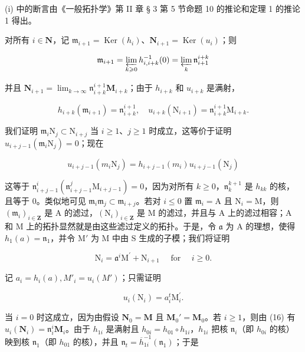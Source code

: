 	(i) 中的断言由《一般拓扑学》第 II 章 § 3 第 5 节命题 10 的推论和定理 1 的推论 1 得出。

	对所有 \(i \in \mathbf{N}\)，记 \(\mathfrak{m}_{i+1} = \operatorname{Ker}(h_i)\)、\(\mathbf{N}_{i+1} = \operatorname{Ker}(u_i)\)；则

\[
\mathfrak {m} _ {i + 1} = \varprojlim_ {k \geqslant 0} h _ {i, i + k} ^ {- 1} (0) = \varprojlim_ {k} \mathfrak {n} _ {i + 1} ^ {i + k}
\]

	并且 \(\mathbf{N}_{i + 1} = \lim_{k\to \infty}\mathfrak{n}_{i + k}^{i + 1}\mathbf{M}_{i + k}\)；由于 \(h_{i + k}\) 和 \(u_{i + k}\) 是满射，

\[
h _ {i + k} \left(\mathfrak {m} _ {i + 1}\right) = \mathfrak {n} _ {i + k} ^ {i + 1}, \quad u _ {i + k} \left(\mathrm{N} _ {i + 1}\right) = \mathfrak {n} _ {i + k} ^ {i + 1} \mathrm{M} _ {i + k}.\tag{16}
\]

	我们证明 \(\mathfrak{m}_i\mathrm{N}_j\subset \mathrm{N}_{i + j}\) 当 \(i\geqslant 1\)、\(j\geqslant 1\) 时成立，这等价于证明 \(u_{i + j - 1}(\mathfrak{m}_i\mathrm{N}_j) = 0\)；现在

\[
u _ {i + j - 1} (m _ {i} \mathrm{N} _ {j}) = h _ {i + j - 1} (m _ {i}) u _ {i + j - 1} (\mathrm{N} _ {j})
\]

	这等于 \(\mathfrak{n}_{i+j-1}^{i}(\mathfrak{n}_{i+j-1}^{j}\mathrm{M}_{i+j-1}) = 0\)，因为对所有 \(k \geqslant 0\)，\(\mathfrak{n}_k^{k+1}\) 是 \(h_{kk}\) 的核，且等于 0。类似地可见 \(\mathfrak{m}_i\mathfrak{m}_j \subset \mathfrak{m}_{i+j}\)。若对 \(i \leqslant 0\) 置 \(\mathfrak{m}_i = \mathrm{A}\) 且 \(\mathrm{N}_i = \mathrm{M}\)，则 \((\mathfrak{m}_i)_{i \in \mathbf{Z}}\) 是 \(\mathrm{A}\) 的滤过，\((\mathrm{N}_i)_{i \in \mathbf{Z}}\) 是 \(\mathrm{M}\) 的滤过，并且与 \(\mathrm{A}\) 上的滤过相容；\(\mathrm{A}\) 和 \(\mathrm{M}\) 上的拓扑显然就是由这些滤过定义的拓扑。于是，令 \(\mathfrak{a}\) 为 \(\mathrm{A}\) 的理想，使得 \(h_1(a) = \mathfrak{n}_1\)，并令 \(\mathrm{M}'\) 为 \(\mathrm{M}\) 中由 \(\mathrm{S}\) 生成的子模；我们将证明

\[
\mathrm{N} _ {i} = \mathfrak {a} ^ {i} \mathrm{M} ^ {\prime} + \mathrm{N} _ {i + 1} \quad \text { for } \quad i \geqslant 0.\tag{17}
\]

	记 \(a_i = h_i(a), M'_i = u_i(M')\)；只需证明

\[
u _ {i} \left(\mathrm{N} _ {i}\right) = a _ {i} ^ {t} \mathrm{M} _ {i} ^ {\prime}.
\]

	当 \(i = 0\) 时这成立，因为由假设 \(\mathbf{N}_0 = \mathbf{M}\) 且 \(\mathbf{M}_0' = \mathbf{M}_0\)。若 \(i \geqslant 1\)，则由 (16) 有 \(u_i(\mathbf{N}_i) = \mathfrak{n}_i^i\mathbf{M}_i\)。由于 \(h_{1i}\) 是满射且 \(h_{0i} = h_{01} \circ h_{1i}\)，\(h_{1i}\) 把核 \(\mathfrak{n}_i\)（即 \(h_{0i}\) 的核）映到核 \(\mathfrak{n}_1\)（即 \(h_{01}\) 的核），并且 \(\mathfrak{n}_t = \overline{h}_{1i}^{-1}(\mathfrak{n}_1)\)；于是

